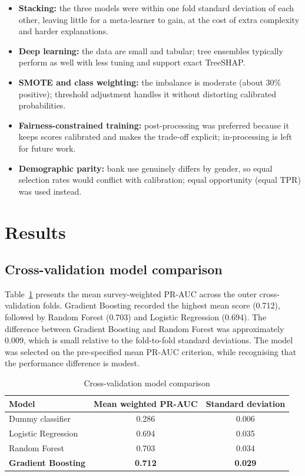 \documentclass[11pt,a4paper]{article}
\begin{document}
\begin{itemize}[leftmargin=*]
  \item \textbf{Stacking:} the three models were within one fold standard deviation of each other, leaving little for a meta-learner to gain, at the cost of extra complexity and harder explanations.
  \item \textbf{Deep learning:} the data are small and tabular; tree ensembles typically perform as well with less tuning and support exact TreeSHAP.
  \item \textbf{SMOTE and class weighting:} the imbalance is moderate (about 30\% positive); threshold adjustment handles it without distorting calibrated probabilities.
  \item \textbf{Fairness-constrained training:} post-processing was preferred because it keeps scores calibrated and makes the trade-off explicit; in-processing is left for future work.
  \item \textbf{Demographic parity:} bank use genuinely differs by gender, so equal selection rates would conflict with calibration; equal opportunity (equal TPR) was used instead.
\end{itemize}


\section{Results}

\subsection{Cross-validation model comparison}

Table~\ref{tab:cv} presents the mean survey-weighted PR-AUC across the outer cross-validation folds. Gradient Boosting recorded the highest mean score (0.712), followed by Random Forest (0.703) and Logistic Regression (0.694). The difference between Gradient Boosting and Random Forest was approximately 0.009, which is small relative to the fold-to-fold standard deviations. The model was selected on the pre-specified mean PR-AUC criterion, while recognising that the performance difference is modest.

\begin{table}[H]
\centering
\caption{Cross-validation model comparison}
\label{tab:cv}
\begin{tabular}{lcc}
\toprule
Model & Mean weighted PR-AUC & Standard deviation\\
\midrule
Dummy classifier & 0.286 & 0.006\\
Logistic Regression & 0.694 & 0.035\\
Random Forest & 0.703 & 0.034\\
\textbf{Gradient Boosting} & \textbf{0.712} & \textbf{0.029}\\
\bottomrule
\end{tabular}
\end{table}
\end{document}
